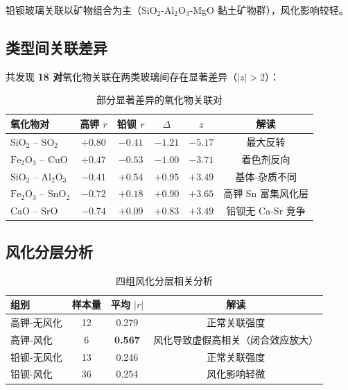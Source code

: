 铅钡玻璃关联以矿物组合为主（$\text{SiO}_2$-$\text{Al}_2\text{O}_3$-MgO 黏土矿物群），风化影响较轻。

\subsection{类型间关联差异}

共发现 \textbf{18 对}氧化物关联在两类玻璃间存在显著差异（$|z| > 2$）：

\begin{table}[H]
    \centering
    \caption{部分显著差异的氧化物关联对}
    \label{tab:diff_corr}
    \begin{tabular}{l c c c c c}
        \toprule
        \textbf{氧化物对} & \textbf{高钾 $r$} & \textbf{铅钡 $r$} & \textbf{$\Delta$} & \textbf{$z$} & \textbf{解读} \\
        \midrule
        $\text{SiO}_2$ -- $\text{SO}_2$ & $+0.80$ & $-0.41$ & $-1.21$ & $-5.17$ & 最大反转 \\
        $\text{Fe}_2\text{O}_3$ -- CuO & $+0.47$ & $-0.53$ & $-1.00$ & $-3.71$ & 着色剂反向 \\
        $\text{SiO}_2$ -- $\text{Al}_2\text{O}_3$ & $-0.41$ & $+0.54$ & $+0.95$ & $+3.49$ & 基体-杂质不同 \\
        $\text{Fe}_2\text{O}_3$ -- $\text{SnO}_2$ & $-0.72$ & $+0.18$ & $+0.90$ & $+3.65$ & 高钾 Sn 富集风化层 \\
        CaO -- SrO & $-0.74$ & $+0.09$ & $+0.83$ & $+3.49$ & 铅钡无 Ca-Sr 竞争 \\
        \bottomrule
    \end{tabular}
\end{table}

\subsection{风化分层分析}

\begin{table}[H]
    \centering
    \caption{四组风化分层相关分析}
    \label{tab:layer_corr}
    \begin{tabular}{l c c c}
        \toprule
        \textbf{组别} & \textbf{样本量} & \textbf{平均 $|r|$} & \textbf{解读} \\
        \midrule
        高钾-无风化 & 12 & 0.279 & 正常关联强度 \\
        高钾-风化 & 6 & \textbf{0.567} & 风化导致虚假高相关（闭合效应放大） \\
        铅钡-无风化 & 13 & 0.246 & 正常关联强度 \\
        铅钡-风化 & 36 & 0.254 & 风化影响轻微 \\
        \bottomrule
    \end{tabular}
\end{table}

